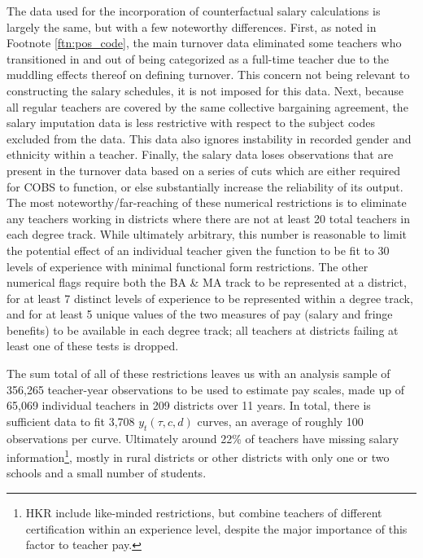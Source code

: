 \documentclass[12pt,]{article}
\let\rmarkdownfootnote\footnote%
\def\footnote{\protect\rmarkdownfootnote}
\begin{document}
The data used for the incorporation of counterfactual salary
calculations is largely the same, but with a few noteworthy differences.
First, as noted in Footnote \ref{ftn:pos_code}, the main turnover data
eliminated some teachers who transitioned in and out of being
categorized as a full-time teacher due to the muddling effects thereof
on defining turnover. This concern not being relevant to constructing
the salary schedules, it is not imposed for this data. Next, because all
regular teachers are covered by the same collective bargaining
agreement, the salary imputation data is less restrictive with respect
to the subject codes excluded from the data. This data also ignores
instability in recorded gender and ethnicity within a teacher. Finally,
the salary data loses observations that are present in the turnover data
based on a series of cuts which are either required for COBS to
function, or else substantially increase the reliability of its output.
The most noteworthy/far-reaching of these numerical restrictions is to
eliminate any teachers working in districts where there are not at least
20 total teachers in each degree track. While ultimately arbitrary, this
number is reasonable to limit the potential effect of an individual
teacher given the function to be fit to 30 levels of experience with
minimal functional form restrictions. The other numerical flags require
both the BA \& MA track to be represented at a district, for at least 7
distinct levels of experience to be represented within a degree track,
and for at least 5 unique values of the two measures of pay (salary and
fringe benefits) to be available in each degree track; all teachers at
districts failing at least one of these tests is dropped.

The sum total of all of these restrictions leaves us with an analysis
sample of 356,265 teacher-year observations to be used to estimate pay
scales, made up of 65,069 individual teachers in 209 districts over 11
years. In total, there is sufficient data to fit 3,708
\(y_t(\tau, c, d)\) curves, an average of roughly 100 observations per
curve. Ultimately around 22\% of teachers have missing salary
information\footnote{HKR include like-minded restrictions, but combine
  teachers of different certification within an experience level,
  despite the major importance of this factor to teacher pay.}, mostly
in rural districts or other districts with only one or two schools and a
small number of students.
\end{document}
